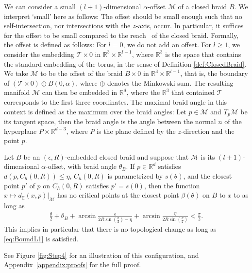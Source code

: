 \documentclass[twoside,leqno]{article}
\newcommand{\M}{\mathcal{M}}
\begin{document}
%
We can consider a small $(l+1)$-dimensional $\alpha$-offset $\M$  of a closed braid $B$. 
We interpret `small' here as follows: The offset should be small enough such that no self-intersection, nor intersections with the $z$-axis, occur. In particular, it suffices for the offset to be small compared to the reach~\cite{Federer} of the closed braid. 
Formally, the offset is defined as follows: For $l=0$, we do not add an offset. For $l \geq 1$, we consider the embedding $\mathcal{T} \times 0$ in $\mathbb{R}^3 \times \mathbb{R}^{l-1}$, where $\mathbb{R}^3$ is the space that contains the standard embedding of the torus, in the sense of Definition \ref{def:ClosedBraid}. We take $\M$ to be the offset of the braid $B\times 0$ in $\mathbb{R}^3 \times \mathbb{R}^{l-1}$, that is, the boundary of $(\mathcal{T}\times 0 ) \oplus B(0,\alpha)$, where $\oplus$ denotes the Minkowski sum. The resulting manifold $\M$ can then be embedded in $\mathbb{R}^d$, where the $\mathbb{R}^3$ that contained $\mathcal{T}$ corresponds to the first three coordinates. 
The maximal braid angle in this context is defined as the maximum over the braid angles: Let $p \in \M$ and $T_p\M$ be its tangent space, then the braid angle is the angle between the normal $n$ of the hyperplane $P \times \mathbb{R}^{d-3}$, where $P$ is the plane defined by the $z$-direction and the point $p$. 

\begin{lemma} \label{Lem:Step2} Let $B$ be an $(\epsilon,R)$-embedded closed braid and suppose that $\M$ is its $(l+1)$-dimensional $\alpha$-offset, with braid angle $\theta_B$. If $p \in \mathbb{R}^d$ satisfies $d (p, C_h(0,R)) \leq \eta$, $C_h(0,R)$ is parametrized by $s(\theta)$, and the closest point $p'$ of $p$ on $C_h(0,R)$ satisfies $p' =s(0)$, then the function $x \mapsto d_\mathbb{E}(x, p)|_\M$ has no critical points at the closest point $\beta (\theta)$ on $B$ to $x$ to as long as  
\begin{align}  \frac{\theta}{2} + \theta_B + \arcsin \frac{\epsilon} { 2 R \sin (\frac{\theta}{2})  -\eta } +\arcsin \frac{\eta} { 2 R \sin (\frac{\theta}{2})  }  <\frac{\pi}{ 2} .
\label{eq:BoundL1}
\end{align} 
This implies in particular that there is no topological change as long as \eqref{eq:BoundL1} is satisfied. 
%
%
%
\end{lemma} 
See Figure \ref{fig:Step4} for an illustration of this configuration, and Appendix~\ref{appendix:proofs} for the full proof.
\end{document}

